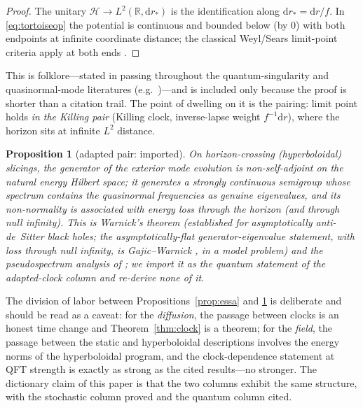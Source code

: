 \documentclass[11pt]{article}
\newtheorem{proposition}[theorem]{Proposition}
\theoremstyle{definition}
\theoremstyle{remark}
\newcommand{\dd}{\mathrm{d}}
\newcommand{\rstar}{r_{*}}
\begin{document}
\begin{proof}
The unitary $\mathcal H\to L^{2}(\mathbb{R},\dd\rstar)$ is the
identification along $\dd\rstar=\dd r/f$. In
\eqref{eq:tortoiseop} the potential is continuous and bounded below
(by $0$) with both endpoints at infinite coordinate distance; the
classical Weyl/Sears limit-point criteria apply at both ends
\cite[Thm.~X.8 and Appendix to X.1]{ReedSimon2}.
\end{proof}

This is folklore---stated in passing throughout the quantum-singularity
and quasinormal-mode literatures (e.g.\
\cite{HorowitzMarolf1995})---and is included only because the proof is
shorter than a citation trail. The point of dwelling on it is the
pairing: limit point holds \emph{in the Killing pair} (Killing clock,
inverse-lapse weight $f^{-1}\dd r$), where the horizon sits at
infinite $L^{2}$ distance.

\begin{proposition}[adapted pair: imported]
\label{prop:imported}
On horizon-crossing (hyperboloidal) slicings, the generator of the
exterior mode evolution is non-self-adjoint on the natural energy
Hilbert space; it generates a strongly continuous semigroup whose
spectrum contains the quasinormal frequencies as genuine eigenvalues,
and its non-normality is associated with energy loss through the
horizon (and through null infinity). This is Warnick's theorem
\cite{Warnick2015} (established for asymptotically anti-de~Sitter black
holes; the asymptotically-flat generator-eigenvalue statement, with
loss through null infinity, is Gajic--Warnick \cite{GajicWarnick2020},
in a model problem)
and the pseudospectrum analysis of
\cite{Jaramillo2021}; we import it as the quantum statement of the
adapted-clock column and re-derive none of it.
\end{proposition}

The division of labor between Propositions~\ref{prop:essa} and
\ref{prop:imported} is deliberate and should be read as a caveat: for
the \emph{diffusion}, the passage between clocks is an honest time
change and Theorem~\ref{thm:clock} is a theorem; for the \emph{field},
the passage between the static and hyperboloidal descriptions
involves the energy norms of the hyperboloidal program, and the
clock-dependence statement at QFT strength is exactly as strong as
the cited results---no stronger. The dictionary claim of this paper
is that the two columns exhibit the same structure, with the
stochastic column proved and the quantum column cited.
\end{document}

